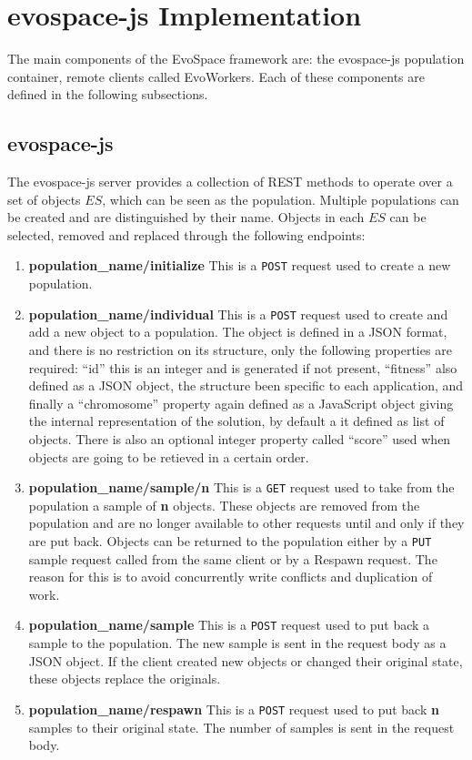 \section{evospace-js Implementation}
\label{sec:evo}
The main components of the EvoSpace framework are: the evospace-js 
population container, remote clients called EvoWorkers.
Each of these components are defined in the following subsections.

\subsection{evospace-js}
 \label{sec:evospace}
The evospace-js server provides a collection of REST methods  
to operate over a set of objects $ES$, which can be seen as the 
population. Multiple populations can be created and are 
distinguished by their name. Objects in each $ES$ 
can be selected, removed and replaced through the 
following endpoints:
\begin{enumerate}
    \item {\bf population\_name/initialize} 
    This is a {\tt POST} request used to create a new population.
    \item {\bf population\_name/individual} 
    This is a {\tt POST} request used to create and add a new object
    to a population. The object is defined in a JSON format, 
    and there is no restriction on its structure, only 
    the following properties are required: ``id'' this is an 
    integer and is generated if not present, ``fitness'' also defined 
    as a JSON object, the structure been specific to each application, 
    and finally a ``chromosome'' property again defined as
    a JavaScript object giving the internal representation of 
    the solution, by default a it defined as list of objects. 
    There is also an optional integer property called 
    ``score'' used when objects are going to be retieved in a certain order.
    \item {\bf population\_name/sample/n}
    This is a {\tt GET}  request used to take from the population a 
    sample of {\bf n} objects. These objects are removed from the population and are no longer available
    to other requests until and only if they are put back. Objects can be returned to the population 
    either by a {\tt PUT} sample request called from the same client or by a Respawn request. The reason for 
    this is to avoid concurrently write conflicts and duplication of work.
    \item {\bf population\_name/sample}
    This is a {\tt POST} request used to put back a sample to the population.
    The new sample is sent in the request body as a JSON object. If the client created new objects or 
    changed their original state, these objects replace the originals. 
    \item {\bf population\_name/respawn}
    This is a {\tt POST} request used to put back {\bf n} samples to their 
    original state. The number of samples is sent in the request body. 
\end{enumerate}
